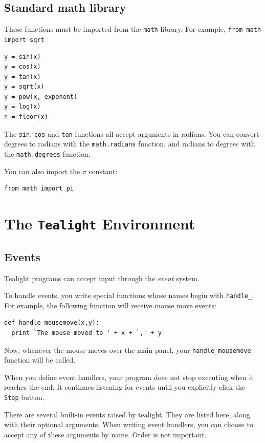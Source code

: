 \documentclass[12pt,a4paper,twoside]{article}
\renewcommand{\_}{\texttt{\symbol{95}}}
\begin{document}
\subsection{Standard math library} \label{sec:stand-math-libr}

These functions must be imported from the \verb^math^ library. For example, \verb^from math import sqrt^

\begin{verbatim}
y = sin(x)
y = cos(x)
y = tan(x)
y = sqrt(x)
y = pow(x, exponent)
y = log(x)
n = floor(x)
\end{verbatim}

The \verb^sin^, \verb^cos^ and \verb^tan^ functions all accept
arguments in radians. You can convert degrees to radians with the \verb^math.radians^ function, and radians to degrees with the \verb^math.degrees^ function.

You can also import the $\pi$ constant:

\begin{verbatim}
from math import pi
\end{verbatim}

\section{The \textbf{\texttt{Tealight}} Environment}

\subsection{Events}

Tealight programs can accept input through the \textit{event} system.

To handle events, you write special functions whose names begin with \verb^handle_^. For example, the following function will receive mouse move events:

\begin{verbatim}
def handle_mousemove(x,y):
  print `The mouse moved to ' + x + `,' + y
\end{verbatim}

Now, whenever the mouse moves over the main panel, your \verb^handle_mousemove^ function will be called.

When you define event handlers, your program does not stop executing when it reaches the end. It continues listening for events until you explicitly click the \verb^Stop^ button.

There are several built-in events raised by tealight. They are listed here, along with their optional arguments. When writing event handlers, you can choose to accept any of these arguments by name. Order is not important.
\end{document}
